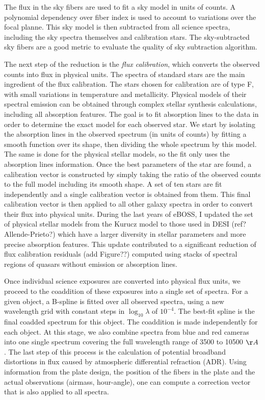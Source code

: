 The flux in the sky fibers are used to fit a sky model in units of counts.
A polynomial dependency over fiber index is used to account to variations 
over the focal planne. This sky model is then subtracted from all science 
spectra, including the sky spectra themselves and calibration stars. 
The sky-subtracted sky fibers are a good metric to evaluate the quality of 
sky subtraction algorithm. 

The next step of the reduction is the \emph{flux calibration}, 
which converts the observed counts into flux in physical units. 
The spectra of standard stars are the main ingredient of the flux calibration. 
The stars chosen for calibration are of type F, with small variations in 
temperature and metallicity. Physical models of their spectral emission 
can be obtained through complex stellar synthesis calculations, including 
all absorption features. The goal is to fit absorption lines to the data 
in order to determine the exact model for each observed star. 
We start by isolating the absorption lines in the observed spectrum 
(in units of counts) by fitting a smooth function over its shape, 
then dividing the whole spectrum by this model. The same is done 
for the physical stellar models, so the fit only uses the absorption 
lines information. Once the best parameters of the star are found, 
a calibration vector is constructed by simply taking the ratio of 
the observed counts to the full model including its smooth shape. 
A set of ten stars are fit independently and a single calibration 
vector is obtained from them. This final calibration vector is then 
applied to all other galaxy spectra in order to convert their 
flux into physical units. During the last years of eBOSS, I updated 
the set of physical stellar models from the Kurucz model to those used 
in DESI (ref? Allende-Prieto?) which have a larger diversity in stellar 
parameters and more precise absorption features. This update contributed
to a significant reduction of flux calibration residuals (add Figure??) 
computed using stacks of spectral regions of quasars without emission 
or absorption lines.

Once individual science exposures are converted into physical flux units, 
we proceed to the coaddition of these exposures into a single set of spectra. 
For a given object, a B-spline is fitted over all observed spectra, 
using a new wavelength grid with constant steps in $\log_{10} \lambda$ of $10^{-4}$. 
The best-fit spline is the final coadded spectrum for this object. 
The coaddition is made independently for each object. 
At this stage, we also combine spectra from blue and red cameras into 
one single spectrum covering the full wavelength range of 3500 to 10500 $\AA$. 
The last step of this process is the calculation of potential broadband 
distortions in flux caused by atmospheric differential refraction (ADR). 
Using information from the plate design, the position of the fibers in 
the plate and the actual observations (airmass, hour-angle), one can 
compute a correction vector that is also applied to all spectra. 

